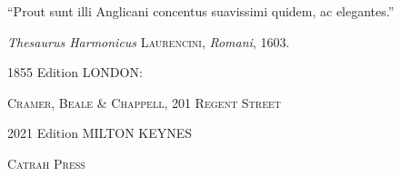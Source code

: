\begin{center}
\footnotesize “Prout sunt illi Anglicani concentus suavissimi quidem, ac elegantes.”

\textit{Thesaurus Harmonicus} \textsc{Laurencini}, \textit{Romani}, 1603.

\titlespace

\small 1855 Edition LONDON:

\textsc{Cramer, Beale \& Chappell, 201 Regent Street}

\titlespace

2021 Edition MILTON KEYNES

\textsc{Catrah Press}

\normalsize
\vfill
\end{center}

\pagebreak